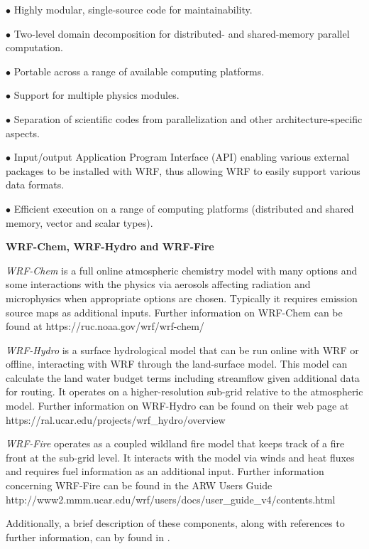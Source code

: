 \begin{description}
\setlength{\itemsep}{-5pt}
\item{$\bullet$} Highly modular, single-source code for maintainability.
%
\item{$\bullet$} Two-level domain decomposition for distributed- and 
shared-memory parallel computation.
%
\item{$\bullet$} Portable across a range of available computing platforms.
%
\item{$\bullet$} Support for multiple physics modules.
%
\item{$\bullet$}
Separation of scientific codes from parallelization and other 
architecture-specific aspects.
%
\item{$\bullet$}
Input/output Application Program Interface (API) enabling various external
packages to be installed with WRF, thus allowing WRF
to easily support various data formats.
%
\item{$\bullet$}
Efficient execution on a range of computing platforms
(distributed and shared memory, vector
and scalar types).
%
%
\end{description}

\vskip 12pt
{\noindent\bf WRF-Chem, WRF-Hydro and WRF-Fire}
\vskip 12pt

{\em WRF-Chem} is a full online atmospheric chemistry model with many options and some
interactions with the physics via aerosols affecting radiation and microphysics when appropriate
options are chosen. Typically it requires emission source maps as additional inputs.  Further information on WRF-Chem can be found at
https://ruc.noaa.gov/wrf/wrf-chem/

{\em WRF-Hydro} is a surface hydrological model that can be run online with WRF or offline,
interacting with WRF through the land-surface model. This model can calculate the land water
budget terms including streamflow given additional data for routing. It operates on a higher-resolution
sub-grid relative to the atmospheric model.  Further information on WRF-Hydro can be found on their web page at
https://ral.ucar.edu/projects/wrf\_hydro/overview

{\em WRF-Fire} operates as a coupled wildland fire model that keeps track of a fire front at the
sub-grid level. It interacts with the model via winds and heat fluxes and requires fuel information as
an additional input.  Further information concerning WRF-Fire can be found in the ARW Users Guide 
http://www2.mmm.ucar.edu/wrf/users/docs/user\_guide\_v4/contents.html

Additionally, a brief description of these components, along with references to further information, can by found in \citet{powers17}.